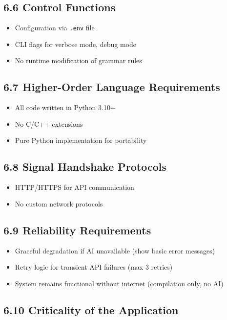 \documentclass[a4paper,11pt]{article}
\begin{document}
\subsection{6.6 Control Functions}

\begin{itemize}
    \item Configuration via \texttt{.env} file
    \item CLI flags for verbose mode, debug mode
    \item No runtime modification of grammar rules
\end{itemize}

\subsection{6.7 Higher-Order Language Requirements}

\begin{itemize}
    \item All code written in Python 3.10+
    \item No C/C++ extensions
    \item Pure Python implementation for portability
\end{itemize}

\subsection{6.8 Signal Handshake Protocols}

\begin{itemize}
    \item HTTP/HTTPS for API communication
    \item No custom network protocols
\end{itemize}

\subsection{6.9 Reliability Requirements}

\begin{itemize}
    \item Graceful degradation if AI unavailable (show basic error messages)
    \item Retry logic for transient API failures (max 3 retries)
    \item System remains functional without internet (compilation only, no AI)
\end{itemize}

\subsection{6.10 Criticality of the Application}
\end{document}
